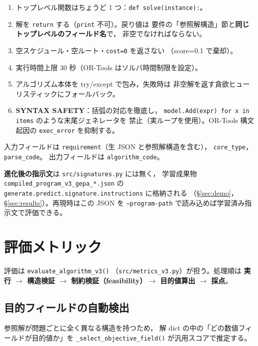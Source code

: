\documentclass[uplatex,dvipdfmx,a4paper,11pt]{jsarticle}
\begin{document}
\begin{enumerate}
  \item トップレベル関数はちょうど 1 つ：\texttt{def solve(instance):}。
  \item 解を \texttt{return} する（\texttt{print} 不可）。戻り値は
    要件の「参照解構造」節と\textbf{同じトップレベルのフィールド名}で，
    非空でなければならない。
  \item 空スケジュール・空ルート・\texttt{cost=0} を返さない
    （score=0.1 で棄却）。
  \item 実行時間上限 30 秒（OR-Tools はソルバ時間制限を設定）。
  \item アルゴリズム本体を try/except で包み，失敗時は
    非空解を返す貪欲ヒューリスティックにフォールバック。
  \item \textbf{SYNTAX SAFETY}：括弧の対応を徹底し，
    \texttt{model.Add(expr) for x in items} のような末尾ジェネレータを
    禁止（実ループを使用）。OR-Tools 構文起因の
    \texttt{exec\_error} を抑制する。
\end{enumerate}

入力フィールドは \texttt{requirement}（生 JSON と参照解構造を含む），
\texttt{core\_type}，\texttt{parse\_code}。
出力フィールドは \texttt{algorithm\_code}。

\textbf{進化後の指示文}は \texttt{src/signatures.py} には無く，
学習成果物
\texttt{compiled\_program\_v3\_gepa\_*.json} の
\texttt{generate.predict.signature.instructions} に格納される
（\S\ref{sec:demo}，\S\ref{sec:results}）。再現時はこの JSON を
\texttt{--program-path} で読み込めば学習済み指示文で評価できる。

\section{評価メトリック}\label{sec:metric}

評価は \texttt{evaluate\_algorithm\_v3()}
（\texttt{src/metrics\_v3.py}）が担う。処理順は
\textbf{実行 $\to$ 構造検証 $\to$ 制約検証（feasibility）$\to$
目的値算出 $\to$ 採点}。

\subsection{目的フィールドの自動検出}\label{sec:objsel}

参照解が問題ごとに全く異なる構造を持つため，
解 dict の中の「どの数値フィールドが目的値か」を
\texttt{\_select\_objective\_field()} が汎用スコアで推定する。
\end{document}

